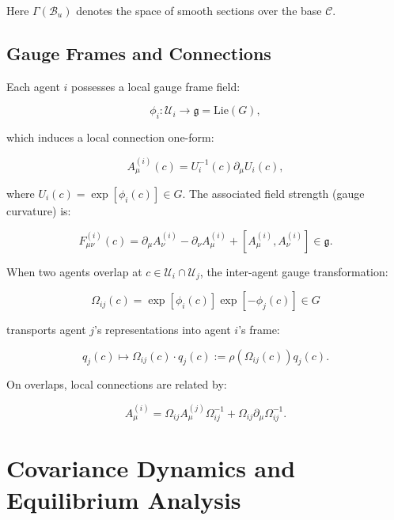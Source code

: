 \documentclass[twoside,11pt]{article}
\begin{document}
Here $\Gamma(\mathcal{B}_u)$ denotes the space of smooth sections over the base $\mathcal{C}$.

\subsection{Gauge Frames and Connections}
Each agent $i$ possesses a local gauge frame field:

\begin{equation}
\phi_i: \mathcal{U}_i \to \mathfrak{g} = \text{Lie}(G),
\end{equation}

which induces a local connection one-form:

\begin{equation}
A^{(i)}_\mu(c) = U_i^{-1}(c) \partial_\mu U_i(c),
\end{equation}

where $U_i(c) = \exp[\phi_i(c)] \in G$. The associated field strength (gauge curvature) is:

\begin{equation}
F^{(i)}_{\mu\nu}(c) = \partial_\mu A^{(i)}_\nu - \partial_\nu A^{(i)}_\mu + [A^{(i)}_\mu, A^{(i)}_\nu] \in \mathfrak{g}.
\end{equation}

When two agents overlap at $c \in \mathcal{U}_i \cap \mathcal{U}_j$, the inter-agent gauge transformation:

\begin{equation}
\Omega_{ij}(c) = \exp[\phi_i(c)] \exp[-\phi_j(c)] \in G
\end{equation}

transports agent $j$'s representations into agent $i$'s frame:

\begin{equation}
q_j(c) \mapsto \Omega_{ij}(c) \cdot q_j(c) := \rho(\Omega_{ij}(c)) q_j(c).
\end{equation}

On overlaps, local connections are related by:

\begin{equation}
A^{(i)}_\mu = \Omega_{ij} A^{(j)}_\mu \Omega_{ij}^{-1} + \Omega_{ij} \partial_\mu \Omega_{ij}^{-1}.
\end{equation}



\section{Covariance Dynamics and Equilibrium Analysis}
\label{app:covariance_dynamics}
\end{document}
